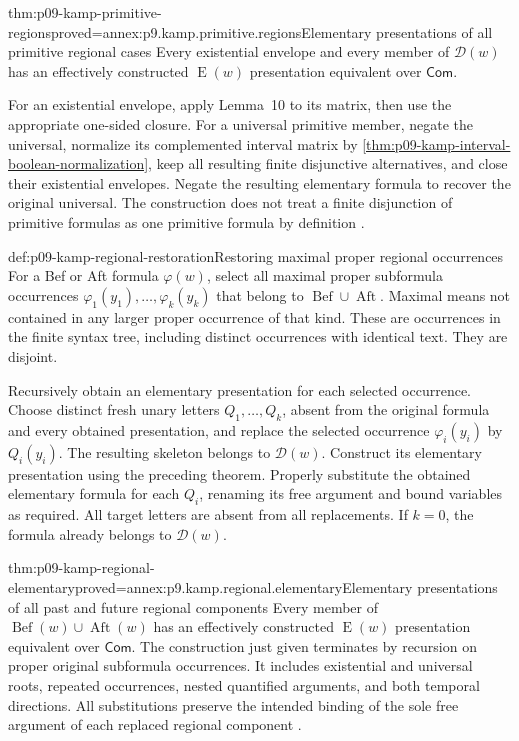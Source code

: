 \begin{hblemma}{thm:p09-kamp-primitive-regions}{proved=annex:p9.kamp.primitive.regions}{Elementary presentations of all primitive regional cases}
Every existential envelope and every member of \(\mathcal D(w)\)
has an effectively constructed \(\operatorname{E}(w)\)
presentation equivalent over \(\mathsf{Com}\).

For an existential envelope, apply Lemma~10 to its matrix, then use
the appropriate one-sided closure. For a universal primitive member,
negate the universal, normalize its complemented interval matrix by
\cref{thm:p09-kamp-interval-boolean-normalization}, keep all resulting
finite disjunctive alternatives, and close their existential envelopes.
Negate the resulting elementary formula to recover the original universal.
The construction does not treat a finite disjunction of primitive
formulas as one primitive formula by definition
\cite[ch.~III, pp.~61--62, 93--94]{Kamp1968}.
\end{hblemma}

\begin{hbmethod}{def:p09-kamp-regional-restoration}{Restoring maximal proper regional occurrences}
For a Bef or Aft formula \(\varphi(w)\), select all maximal proper
subformula occurrences \(\varphi_1(y_1),\ldots,\varphi_k(y_k)\)
that belong to \(\operatorname{Bef}\cup\operatorname{Aft}\).
Maximal means not contained in any larger proper occurrence of that kind.
These are occurrences in the finite syntax tree, including distinct
occurrences with identical text. They are disjoint.

Recursively obtain an elementary presentation for each selected occurrence.
Choose distinct fresh unary letters \(Q_1,\ldots,Q_k\), absent
from the original formula and every obtained presentation, and replace
the selected occurrence \(\varphi_i(y_i)\) by \(Q_i(y_i)\).
The resulting skeleton belongs to \(\mathcal D(w)\).
Construct its elementary presentation using the preceding theorem.
Properly substitute the obtained elementary formula for each \(Q_i\),
renaming its free argument and bound variables as required.
All target letters are absent from all replacements. If \(k=0\),
the formula already belongs to \(\mathcal D(w)\).
\end{hbmethod}

\begin{hblemma}{thm:p09-kamp-regional-elementary}{proved=annex:p9.kamp.regional.elementary}{Elementary presentations of all past and future regional components}
Every member of \(\operatorname{Bef}(w)\cup\operatorname{Aft}(w)\)
has an effectively constructed \(\operatorname{E}(w)\)
presentation equivalent over \(\mathsf{Com}\). The construction
just given terminates by recursion on proper original subformula occurrences.
It includes existential and universal roots, repeated occurrences, nested
quantified arguments, and both temporal directions. All substitutions
preserve the intended binding of the sole free argument of each replaced
regional component \cite[ch.~III, pp.~60--62, 93--94]{Kamp1968}.
\end{hblemma}

